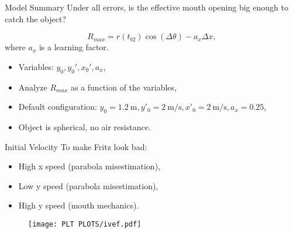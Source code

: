 \documentclass[compress,12pt,mp]{beamer}
\begin{document}
\begin{frame}[t]{Model Summary}
Under all errors, is the effective mouth opening big enough to catch the object?

    $$R_{max}=r(t_{b2})\cos(\Delta \theta)-a_x\Delta x,$$
    where $a_x$ is a learning factor.   %
    \begin{itemize} 
    \item Variables: $y_0, y_0', x_0', a_x$,
    \item Analyze $R_{max}$ as a function of the variables,
    \item Default configuration: $y_0=\SI{1.2}{\m}, y'_0=\SI[per-mode=symbol]{2}{\m\per\s}, x'_0=\SI[per-mode=symbol]{2}{\m\per\s}, a_x=0.25$,
    \item Object is spherical, no air resistance.
    \end{itemize}

\end{frame}


\begin{frame}[t]{Initial Velocity}
To make Fritz look bad:
\begin{itemize}
\item High x speed (parabola misestimation),    %

\item Low y speed (parabola misestimation), %

\item High y speed (mouth mechanics).


\end{itemize}
\begin{figure}
  \centering
  \texttt{[image: PLT PLOTS/ivef.pdf]}
\end{figure}
\end{frame}
\end{document}
